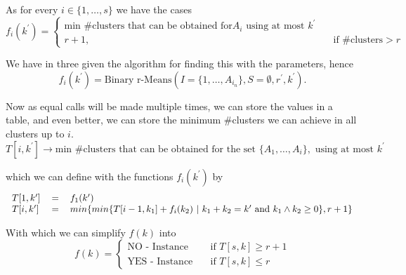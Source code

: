 \documentclass[a4paper]{article}
\begin{document}
As for every $i \in \{1,\dots,s\}$ we have the cases
\[ f_i(k^\prime) =
    \begin{cases}
        \text{min \#clusters that can be obtained for} A_i \text{ using at most } k^\prime &                                \\
        r+1,                                                                               & \quad \text{if \#clusters} > r
    \end{cases}
\]

We have in  three given the algorithm for finding this with the parameters, hence
\[
    f_i(k^\prime) = \text{Binary r-Means}(I=\{1,\dots, A_{i_n}\}, S = \emptyset, r^\prime, k^\prime).
\]

Now as equal calls will be made multiple times, we can store the values in a table, and even better, we can store the minimum \#clusters we can achieve in all clusters up to $i$.
\[
    T[i, k^\prime] \rightarrow \text{min \#clusters that can be obtained for the set } \{A_1, \dots, A_i\}, \text{ using at most } k^\prime
\]

which we can define with the functions $f_i(k^\prime)$ by
\[
    \begin{tabular}{lcl}
        $T[1, k^\prime]$ & $=$ & $f_1(k^\prime)$                                                                                              \\
        $T[i, k^\prime]$ & $=$ & $min\{ min\{ T[ i-1, k_1 ] + f_i(k_2) ~|~ k_1 + k_2 = k^\prime \text{~and~} k_1 \wedge k_2 \geq 0\}, r+1 \}$
    \end{tabular}
\]

With which we can simplify $f(k)$ into
\[ f(k) =
    \begin{cases}
        \text{NO - Instance}  & \quad \text{if } T[s,k] \geq r+1 \\
        \text{YES - Instance} & \quad \text{if } T[s,k] \leq r
    \end{cases}
\]
\end{document}
